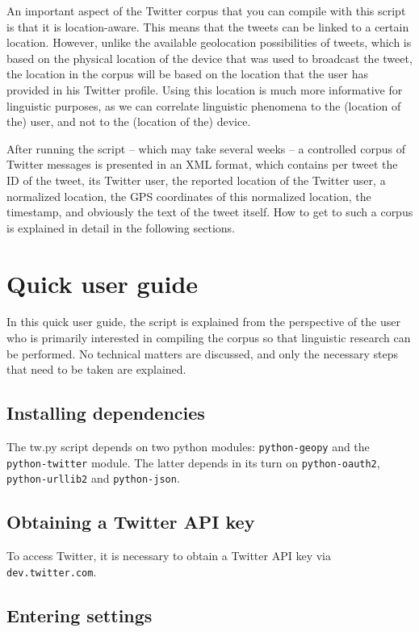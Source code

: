 \documentclass[a4paper,11pt]{article}
\begin{document}
An important aspect of the Twitter corpus that you can compile with this script is that it is location-aware. This means that the tweets can be linked to a certain location. However, unlike the available geolocation possibilities of tweets, which is based on the physical location of the device that was used to broadcast the tweet, the location in the corpus will be based on the location that the user has provided in his Twitter profile. Using this location is much more informative for linguistic purposes, as we can correlate linguistic phenomena to the (location of the) user, and not to the (location of the) device.

After running the script -- which may take several weeks -- a controlled corpus of Twitter messages is presented in an XML format, which contains per tweet the ID of the tweet, its Twitter user, the reported location of the Twitter user, a normalized location, the GPS coordinates of this normalized location, the timestamp, and obviously the text of the tweet itself. How to get to such a corpus is explained in detail in the following sections.

\section{Quick user guide}

In this quick user guide, the script is explained from the perspective of the user who is primarily interested in compiling the corpus so that linguistic research can be performed. No technical matters are discussed, and only the necessary steps that need to be taken are explained.

\subsection{Installing dependencies}

The tw.py script depends on two python modules: \texttt{python-geopy} and the \texttt{python-twitter} module. The latter depends in its turn on \texttt{python-oauth2}, \texttt{python-urllib2} and \texttt{python-json}.

\subsection{Obtaining a Twitter API key}

To access Twitter, it is necessary to obtain a Twitter API key via \texttt{dev.twitter.com}.

\subsection{Entering settings}
\end{document}
